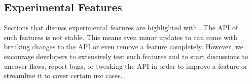\subsection{Experimental Features}

Sections that discuss experimental features are highlighted with \experimental.
The API of such features is not stable. This means even minor updates to \lib
can come with breaking changes to the API or even remove a feature completely.
However, we encourage developers to extensively test such features and to start
discussions to uncover flaws, report bugs, or tweaking the API in order to
improve a feature or streamline it to cover certain use cases.

